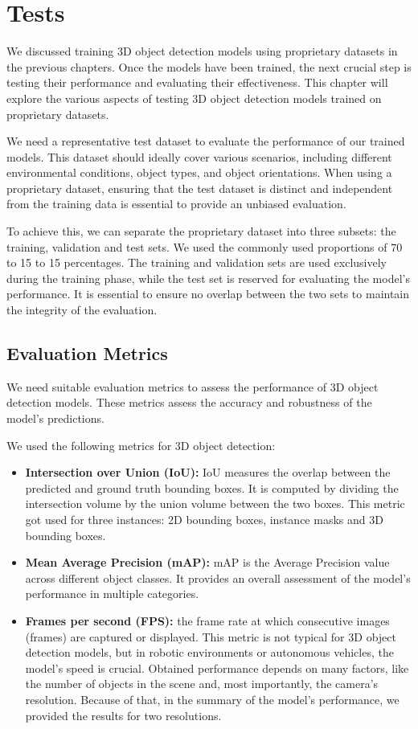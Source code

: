 \chapter{Tests}
We discussed training 3D object detection models using proprietary datasets in the previous chapters. Once the models have been trained, the next crucial step is testing their performance and evaluating their effectiveness. This chapter will explore the various aspects of testing 3D object detection models trained on proprietary datasets.

We need a representative test dataset to evaluate the performance of our trained models. This dataset should ideally cover various scenarios, including different environmental conditions, object types, and object orientations. When using a proprietary dataset, ensuring that the test dataset is distinct and independent from the training data is essential to provide an unbiased evaluation.

To achieve this, we can separate the proprietary dataset into three subsets: the training, validation and test sets. We used the commonly used  proportions of 70 to 15 to 15 percentages. The training and validation sets are used exclusively during the training phase, while the test set is reserved for evaluating the model's performance. It is essential to ensure no overlap between the two sets to maintain the integrity of the evaluation.

\section{Evaluation Metrics}
We need suitable evaluation metrics to assess the performance of 3D object detection models. These metrics assess the accuracy and robustness of the model's predictions. 

\noindent We used the following metrics for 3D object detection:

\begin{itemize}
    \item \textbf{Intersection over Union (IoU):} IoU measures the overlap between the predicted and ground truth bounding boxes. It is computed by dividing the intersection volume by the union volume between the two boxes. This metric got used for three instances: 2D bounding boxes, instance masks and 3D bounding boxes.
    \item \textbf{Mean Average Precision (mAP):} mAP is the Average Precision value across different object classes. It provides an overall assessment of the model's performance in multiple categories.
    \item \textbf{Frames per second (FPS):} the frame rate at which consecutive images (frames) are captured or displayed. This metric is not typical for 3D object detection models, but in robotic environments or autonomous vehicles, the model’s speed is crucial. Obtained performance depends on many factors, like the number of objects in the scene and, most importantly, the camera's resolution. Because of that, in the summary of the model’s performance, we provided the results for two resolutions. 
\end{itemize}

